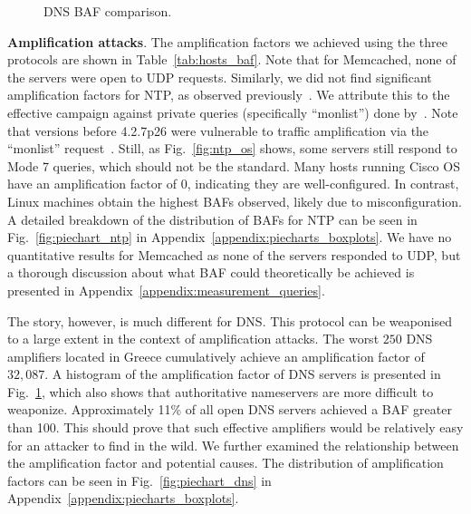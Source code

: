 \begin{figure}[t]
\begin{minipage}[b]{0.2385\textwidth}
        \caption{DNS BAF comparison.}
        \label{fig:dns_auth_hist}
    \end{minipage}
\end{figure}


 \textbf{Amplification attacks}. The amplification factors we achieved using the three protocols are shown in Table~\ref{tab:hosts_baf}. Note that for Memcached, none of the servers were open to UDP requests. Similarly, we did not find significant amplification factors for NTP, as observed previously~\cite{amplification_hell}. We attribute this to the effective campaign against private queries (specifically ``monlist'') done by~\cite{exit_hell}. Note that versions before 4.2.7p26 were vulnerable to traffic amplification via the ``monlist'' request~\cite{ntp_cve}. Still, as Fig.~\ref{fig:ntp_os} shows, some servers still respond to Mode 7 queries, which should not be the standard. Many hosts running Cisco OS have an amplification factor of 0, indicating they are well-configured. In contrast, Linux machines obtain the highest BAFs observed, likely due to misconfiguration. A detailed breakdown of the distribution of BAFs for NTP can be seen in Fig.~\ref{fig:piechart_ntp} in Appendix~\ref{appendix:piecharts_boxplots}. We have no quantitative results for Memcached as none of the servers responded to UDP, but a thorough discussion about what BAF could theoretically be achieved is presented in Appendix~\ref{appendix:measurement_queries}.


 The story, however, is much different for DNS. This protocol can be weaponised to a large extent in the context of amplification attacks. The worst $250$ DNS amplifiers located in Greece cumulatively achieve an amplification factor of $32,087$. A histogram of the amplification factor of DNS servers is presented in Fig.~\ref{fig:dns_auth_hist}, which also shows that authoritative nameservers are more difficult to weaponize. Approximately 11\% of all open DNS servers achieved a BAF greater than 100. This should prove that such effective amplifiers would be relatively easy for an attacker to find in the wild. We further examined the relationship between the amplification factor and potential causes. The distribution of amplification factors can be seen in Fig.~\ref{fig:piechart_dns} in Appendix~\ref{appendix:piecharts_boxplots}.


